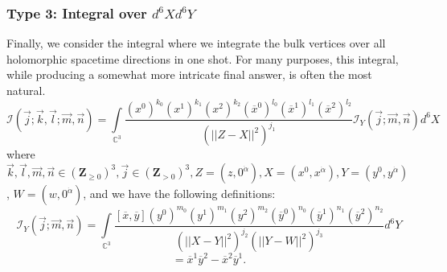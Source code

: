 \documentclass[a4paper,11pt]{article}
\begin{document}
\subsubsection{Type 3: Integral over $d^6X d^6 Y$}
Finally, we consider the integral where we integrate the bulk vertices over all holomorphic spacetime directions in one shot. For many purposes, this integral, while producing a somewhat more intricate final answer, is often the most natural. 
\begin{equation}
    \mathcal{I}(\vec{j};\vec{k},\vec{l};\vec{m}, \vec{n}) = \underset{\mathbb{C}^3}{\int} \frac{(x^0)^{k_0} (x^1)^{k_1} (x^2)^{k_2} (\overline{x}^0)^{l_0} (\overline{x}^1)^{l_1} (\overline{x}^2)^{l_2}}{(\vert \vert Z-X \vert \vert^2)^{j_1}} \mathcal{I}_Y (\vec{j};\vec{m}, \vec{n}) d^6X \label{eq:main I}
\end{equation}
where $\vec{k},\vec{l},\vec{m},\vec{n} \in (\mathbf{Z}_{\geq 0})^3, \vec{j} \in (\mathbf{Z}_{>0})^3, Z = (z,0^{\dot{\alpha}}), X = (x^0,x^{\dot{\alpha}}), Y = (y^0,y^{\dot{\alpha}})$, $W = (w,0^{\dot{\alpha}})$, and we have the following definitions:  
\begin{equation}
    \mathcal{I}_Y (\vec{j};\vec{m}, \vec{n}) = \underset{\mathbb{C}^3}{\int} \frac{[\overline{x},\overline{y}] (y^0)^{m_0} (y^1)^{m_1} (y^2)^{m_2} (\overline{y}^0)^{n_0} (\overline{y}^1)^{n_1} (\overline{y}^2)^{n_2}}{(\vert \vert X-Y \vert \vert^2)^{j_2} (\vert \vert Y-W \vert \vert^2)^{j_3}} d^6Y
\end{equation}
\begin{equation}
    [\overline{x},\overline{y}] = \overline{x}^1 \overline{y}^2 - \overline{x}^2 \overline{y}^1.
\end{equation}
\end{document}
